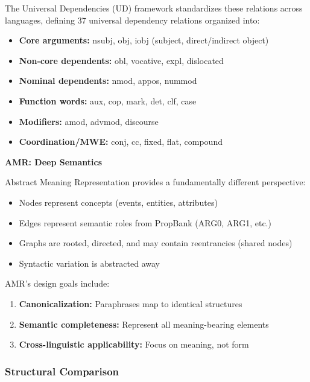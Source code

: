\documentclass[11pt,a4paper]{article}
\begin{document}
The Universal Dependencies (UD) framework \cite{de2016universal} standardizes these relations across languages, defining 37 universal dependency relations organized into:
\begin{itemize}
    \item \textbf{Core arguments:} nsubj, obj, iobj (subject, direct/indirect object)
    \item \textbf{Non-core dependents:} obl, vocative, expl, dislocated
    \item \textbf{Nominal dependents:} nmod, appos, nummod
    \item \textbf{Function words:} aux, cop, mark, det, clf, case
    \item \textbf{Modifiers:} amod, advmod, discourse
    \item \textbf{Coordination/MWE:} conj, cc, fixed, flat, compound
\end{itemize}

\textbf{AMR: Deep Semantics}

Abstract Meaning Representation \cite{banarescu2013abstract} provides a fundamentally different perspective:
\begin{itemize}
    \item Nodes represent concepts (events, entities, attributes)
    \item Edges represent semantic roles from PropBank (ARG0, ARG1, etc.)
    \item Graphs are rooted, directed, and may contain reentrancies (shared nodes)
    \item Syntactic variation is abstracted away
\end{itemize}

AMR's design goals include:
\begin{enumerate}
    \item \textbf{Canonicalization:} Paraphrases map to identical structures
    \item \textbf{Semantic completeness:} Represent all meaning-bearing elements
    \item \textbf{Cross-linguistic applicability:} Focus on meaning, not form
\end{enumerate}

\subsubsection{Structural Comparison}
\end{document}
